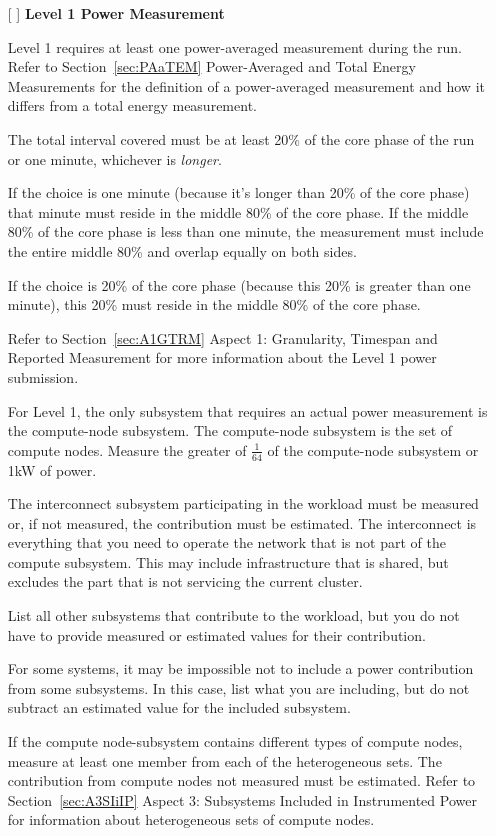 \begin{itemize}
\newpage
\item[{[ ]}]
\textbf{Level 1 Power Measurement}

Level 1 requires at least one power-averaged measurement during the run. Refer to 
Section~\ref{sec:PAaTEM} Power-Averaged and Total Energy Measurements for the definition of a power-averaged measurement and how it differs from a total energy measurement.

The total interval covered must be at least 20\% of the core phase of the run or one minute, whichever is {\itshape longer\/}. 

If the choice is one minute (because it's longer than 20\% of the core phase) that minute must reside in the middle 80\% of the core phase. If the middle 80\% of the core phase is less than one minute, the measurement must include the entire middle 80\% and overlap equally on both sides.

If the choice is 20\% of the core phase (because this 20\% is greater than one minute), this 20\% must reside in the middle 80\% of the core phase.

Refer to Section~\ref{sec:A1GTRM} Aspect 1: Granularity, Timespan and Reported Measurement for more information about the Level 1 power submission.

For Level 1, the only subsystem that requires an actual power measurement is the compute-node subsystem. 
The compute-node subsystem is the set of compute nodes. Measure the greater of $ \frac{1}{64} $ of the compute-node subsystem or 1kW of power.

 
The interconnect subsystem participating in the workload must be measured or, if not measured, the contribution 
must be estimated. The interconnect is everything that you need to operate the network that is not part of the compute subsystem. 
This may include infrastructure that is shared, but excludes the part that is not servicing the current cluster.

List all other subsystems that contribute to the workload, but you do not have to provide 
measured or estimated values for their contribution.

For some systems, it may be impossible not to include a power contribution from some subsystems. In this case, list what you are including, but do not subtract an estimated value for the included subsystem.

If the compute node-subsystem contains different types of compute nodes, measure at least one member from each of the heterogeneous sets. The contribution from compute nodes not measured must be estimated. Refer to 
Section~\ref{sec:A3SIiIP} Aspect 3: Subsystems Included in Instrumented Power for information about
 heterogeneous sets of compute nodes.



\end{itemize}
